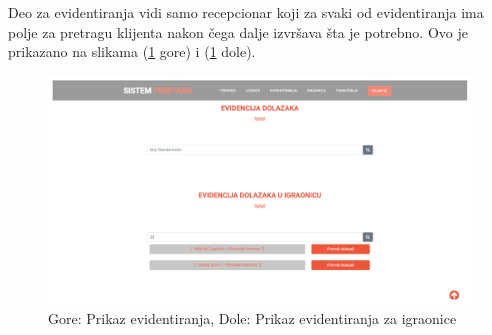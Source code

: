 \documentclass[../main.tex]{subfiles}
\begin{document}
Deo za evidentiranja vidi samo recepcionar koji za svaki od evidentiranja ima polje za pretragu klijenta nakon čega dalje izvršava šta je potrebno. Ovo je prikazano na slikama (\ref{fig:evidentiranja} gore) i (\ref{fig:evidentiranja} dole).

\begin{figure}[!ht]
\begin{center}
\includegraphics[scale=0.30]{sections/korisnicki_interfejs/screenshots/evidentiranja.jpg}
\end{center}
\caption{Gore: Prikaz evidentiranja, Dole: Prikaz evidentiranja za igraonice}
\label{fig:evidentiranja}
\end{figure}
\end{document}
